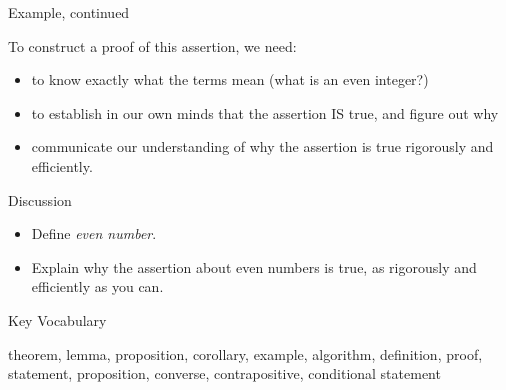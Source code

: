 \documentclass[ignorenonframetext,]{beamer}
\providecommand{\tightlist}{%
  \setlength{\itemsep}{0pt}\setlength{\parskip}{0pt}}
\begin{document}
\begin{frame}{Example, continued}
\protect\hypertarget{example-continued}{}

To construct a proof of this assertion, we need:

\begin{itemize}
\tightlist
\item
  to know exactly what the terms mean (what is an even integer?)
\item
  to establish in our own minds that the assertion IS true, and figure
  out why
\item
  communicate our understanding of why the assertion is true rigorously
  and efficiently.
\end{itemize}

\end{frame}

\begin{frame}{Discussion}
\protect\hypertarget{discussion}{}

\begin{itemize}
\tightlist
\item
  Define \emph{even number}.
\item
  Explain why the assertion about even numbers is true, as rigorously
  and efficiently as you can.
\end{itemize}

\end{frame}

\begin{frame}{Key Vocabulary}
\protect\hypertarget{key-vocabulary}{}

theorem, lemma, proposition, corollary, example, algorithm, definition,
proof, statement, proposition, converse, contrapositive, conditional
statement

\end{frame}
\end{document}
